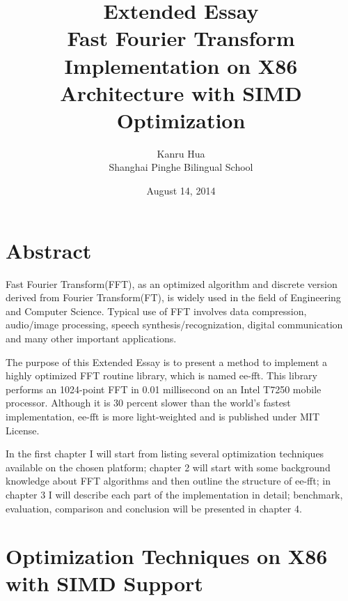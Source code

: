 \documentclass[a4paper]{report}
\begin{document}
\title{\Huge{Extended Essay} \\[2cm] \Large{Fast Fourier Transform Implementation on X86 Architecture with SIMD Optimization} \\[1cm]}
\author{Kanru Hua \\[0.5cm] Shanghai Pinghe Bilingual School}
\date{August 14, 2014}
\maketitle

\newpage

\chapter*{Abstract} \indent

	Fast Fourier Transform(FFT), as an optimized algorithm and discrete version derived from Fourier Transform(FT), is widely used in the field of Engineering and Computer Science. %
	Typical use of FFT involves data compression, audio/image processing, speech synthesis/recognization, digital communication and many other important applications.
	
	The purpose of this Extended Essay is to present a method to implement a highly optimized FFT routine library, which is named ee-fft. This library performs an 1024-point FFT in 0.01 millisecond on an Intel T7250 mobile processor. Although it is 30 percent slower than the world's fastest implementation, ee-fft is more light-weighted and is published under MIT License.

	In the first chapter I will start from listing several optimization techniques available on the chosen platform; chapter 2 will start with some background knowledge about FFT algorithms and then outline the structure of ee-fft; in chapter 3 I will describe each part of the implementation in detail; benchmark, evaluation, comparison and conclusion will be presented in chapter 4.

\newpage
\tableofcontents

\newpage

\chapter{Optimization Techniques on X86 with SIMD Support} \indent
\end{document}
